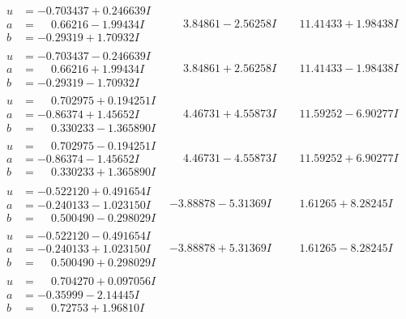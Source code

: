 \documentclass[1p]{elsarticle_modified}
\theoremstyle{definition}
\begin{document}
$$\begin{array}{c|c|c}
\begin{aligned}
u &= -0.703437 + 0.246639 I \\
a &= \phantom{-}0.66216 - 1.99434 I \\
b &= -0.29319 + 1.70932 I\end{aligned}
 & \phantom{-}3.84861 - 2.56258 I & \phantom{-}11.41433 + 1.98438 I \\ \hline\begin{aligned}
u &= -0.703437 - 0.246639 I \\
a &= \phantom{-}0.66216 + 1.99434 I \\
b &= -0.29319 - 1.70932 I\end{aligned}
 & \phantom{-}3.84861 + 2.56258 I & \phantom{-}11.41433 - 1.98438 I \\ \hline\begin{aligned}
u &= \phantom{-}0.702975 + 0.194251 I \\
a &= -0.86374 + 1.45652 I \\
b &= \phantom{-}0.330233 - 1.365890 I\end{aligned}
 & \phantom{-}4.46731 + 4.55873 I & \phantom{-}11.59252 - 6.90277 I \\ \hline\begin{aligned}
u &= \phantom{-}0.702975 - 0.194251 I \\
a &= -0.86374 - 1.45652 I \\
b &= \phantom{-}0.330233 + 1.365890 I\end{aligned}
 & \phantom{-}4.46731 - 4.55873 I & \phantom{-}11.59252 + 6.90277 I \\ \hline\begin{aligned}
u &= -0.522120 + 0.491654 I \\
a &= -0.240133 - 1.023150 I \\
b &= \phantom{-}0.500490 - 0.298029 I\end{aligned}
 & -3.88878 - 5.31369 I & \phantom{-}1.61265 + 8.28245 I \\ \hline\begin{aligned}
u &= -0.522120 - 0.491654 I \\
a &= -0.240133 + 1.023150 I \\
b &= \phantom{-}0.500490 + 0.298029 I\end{aligned}
 & -3.88878 + 5.31369 I & \phantom{-}1.61265 - 8.28245 I \\ \hline\begin{aligned}
u &= \phantom{-}0.704270 + 0.097056 I \\
a &= -0.35999 - 2.14445 I \\
b &= \phantom{-}0.72753 + 1.96810 I\end{aligned}

\end{array}$$
\end{document}
